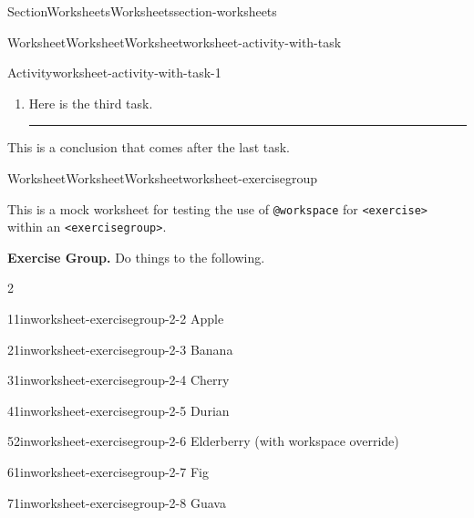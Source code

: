 \documentclass[twoside,10pt,]{article}
\newcommand{\mono}[1]{\texttt{#1}}
\newlength{\workspacestrutwidth}
\numberwithin{equation}{section}
\begin{document}
\begin{sectionptx}{Section}{Worksheets}{}{Worksheets}{}{}{section-worksheets}
\begin{worksheet-subsection}{Worksheet}{Worksheet}{}{Worksheet}{}{}{worksheet-activity-with-task}
\begin{activity}{Activity}{}{worksheet-activity-with-task-1}
\begin{enumerate}[font=\bfseries,label=(\alph*),ref=\alph*]
\par\rule{\workspacestrutwidth}{0.25in}%
\item{}Here is the third task.%
\par\rule{\workspacestrutwidth}{1.75in}%
\end{enumerate}%
This is a conclusion that comes after the last task.%
\end{activity}%
\end{worksheet-subsection}
\restoregeometry
%
%
\typeout{************************************************}
\typeout{************************************************}
%
\begin{worksheet-subsection}{Worksheet}{Worksheet}{}{Worksheet}{}{}{worksheet-exercisegroup}
\begin{introduction}{}%
This is a mock worksheet for testing the use of \mono{@workspace} for \mono{<exercise>} within an \mono{<exercisegroup>}.%
\end{introduction}%
\par\medskip\noindent%
\textbf{Exercise Group.}\space\space%
Do things to the following.%
\begin{exercisegroupcol}{2}
\begin{divisionexerciseegcol}{1}{}{1in}{worksheet-exercisegroup-2-2}%
Apple%
\end{divisionexerciseegcol}%
\begin{divisionexerciseegcol}{2}{}{1in}{worksheet-exercisegroup-2-3}%
Banana%
\end{divisionexerciseegcol}%
\begin{divisionexerciseegcol}{3}{}{1in}{worksheet-exercisegroup-2-4}%
Cherry%
\end{divisionexerciseegcol}%
\begin{divisionexerciseegcol}{4}{}{1in}{worksheet-exercisegroup-2-5}%
Durian%
\end{divisionexerciseegcol}%
\begin{divisionexerciseegcol}{5}{}{2in}{worksheet-exercisegroup-2-6}%
Elderberry (with workspace override)%
\end{divisionexerciseegcol}%
\begin{divisionexerciseegcol}{6}{}{1in}{worksheet-exercisegroup-2-7}%
Fig%
\end{divisionexerciseegcol}%
\begin{divisionexerciseegcol}{7}{}{1in}{worksheet-exercisegroup-2-8}%
Guava%
\end{divisionexerciseegcol}%

\end{exercisegroupcol}
\end{worksheet-subsection}
\end{sectionptx}
\end{document}
